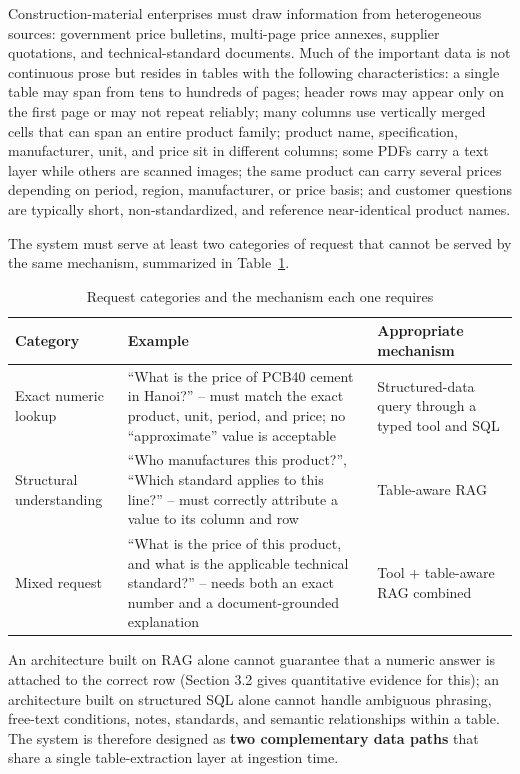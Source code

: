 \documentclass[11pt,a4paper]{article}
\begin{document}
Construction-material enterprises must draw information from heterogeneous
sources: government price bulletins, multi-page price annexes, supplier
quotations, and technical-standard documents. Much of the important data is
not continuous prose but resides in tables with the following
characteristics: a single table may span from tens to hundreds of pages;
header rows may appear only on the first page or may not repeat reliably;
many columns use vertically merged cells that can span an entire product
family; product name, specification, manufacturer, unit, and price sit in
different columns; some PDFs carry a text layer while others are scanned
images; the same product can carry several prices depending on period,
region, manufacturer, or price basis; and customer questions are typically
short, non-standardized, and reference near-identical product names.

The system must serve at least two categories of request that cannot be
served by the same mechanism, summarized in Table~\ref{tab:request-types}.

\begin{table}[htbp]
\centering
\caption{Request categories and the mechanism each one requires}
\label{tab:request-types}
\small
\renewcommand{\arraystretch}{1.3}
\begin{tabularx}{\textwidth}{|p{}|X|p{}|}
\hline
\rowcolor{tableheader}
\textbf{Category} & \textbf{Example} & \textbf{Appropriate mechanism} \\
\hline
Exact numeric lookup &
``What is the price of PCB40 cement in Hanoi?'' -- must match the exact
product, unit, period, and price; no ``approximate'' value is acceptable &
Structured-data query through a typed tool and SQL \\
\hline
Structural understanding &
``Who manufactures this product?'', ``Which standard applies to this
line?'' -- must correctly attribute a value to its column and row &
Table-aware RAG \\
\hline
Mixed request &
``What is the price of this product, and what is the applicable technical
standard?'' -- needs both an exact number and a document-grounded
explanation &
Tool + table-aware RAG combined \\
\hline
\end{tabularx}
\end{table}
\FloatBarrier

An architecture built on RAG alone cannot guarantee that a numeric answer is
attached to the correct row (Section 3.2 gives quantitative evidence for
this); an architecture built on structured SQL alone cannot handle ambiguous
phrasing, free-text conditions, notes, standards, and semantic relationships
within a table. The system is therefore designed as \textbf{two
complementary data paths} that share a single table-extraction layer at
ingestion time.
\end{document}
